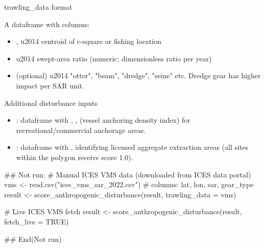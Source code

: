 \documentclass[a4paper]{book}
\begin{document}
%
\begin{Section}{trawling\_data format}

A dataframe with columns:
\begin{itemize}

\item{} ,  \bsl{}u2014 centroid of c-square or fishing location
\item{}  \bsl{}u2014 swept-area ratio (numeric; dimensionless ratio per year)
\item{}  (optional) \bsl{}u2014 "otter", "beam", "dredge", "seine" etc.
Dredge gear has higher impact per SAR unit.

\end{itemize}

\end{Section}
%
\begin{Section}{Additional disturbance inputs}

\begin{itemize}

\item{} : dataframe with , ,  (vessel anchoring
density index) for recreational/commercial anchorage areas.
\item{} : dataframe with ,  identifying licensed
aggregate extraction areas (all sites within the polygon receive score 1.0).

\end{itemize}

\end{Section}
%
\begin{Examples}
\begin{ExampleCode}
## Not run: 
# Manual ICES VMS data (downloaded from ICES data portal)
vms <- read.csv("ices_vms_sar_2022.csv")  # columns: lat, lon, sar, gear_type
result <- score_anthropogenic_disturbance(result, trawling_data = vms)

# Live ICES VMS fetch
result <- score_anthropogenic_disturbance(result, fetch_live = TRUE)

## End(Not run)
\end{ExampleCode}
\end{Examples}
%
\end{document}
